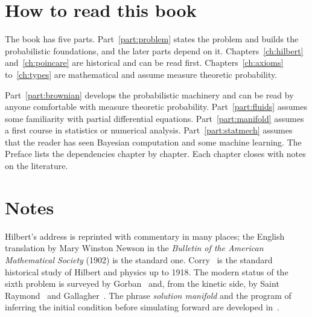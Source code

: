 \section{How to read this book}
\label{sec:howtoread}

The book has five parts. Part~\ref{part:problem} states the problem and builds the probabilistic foundations, and the later parts depend on it. Chapters~\ref{ch:hilbert} and~\ref{ch:poincare} are historical and can be read first. Chapters~\ref{ch:axioms} to~\ref{ch:types} are mathematical and assume measure theoretic probability.

Part~\ref{part:brownian} develops the probabilistic machinery and can be read by anyone comfortable with measure theoretic probability. Part~\ref{part:fluids} assumes some familiarity with partial differential equations. Part~\ref{part:manifold} assumes a first course in statistics or numerical analysis. Part~\ref{part:statmech} assumes that the reader has seen Bayesian computation and some machine learning. The Preface lists the dependencies chapter by chapter. Each chapter closes with notes on the literature.



\section*{Notes}

Hilbert's address is reprinted with commentary in many places; the English translation by Mary Winston Newson in the \emph{Bulletin of the American Mathematical Society} (1902) is the standard one. Corry~\cite{corry2004} is the standard historical study of Hilbert and physics up to 1918. The modern status of the sixth problem is surveyed by Gorban~\cite{gorban2018} and, from the kinetic side, by Saint Raymond~\cite{saintraymond2009} and Gallagher~\cite{gallagher2019}. The phrase \emph{solution manifold} and the program of inferring the initial condition before simulating forward are developed in~\cite{polsonsokolov2026manifold}.
